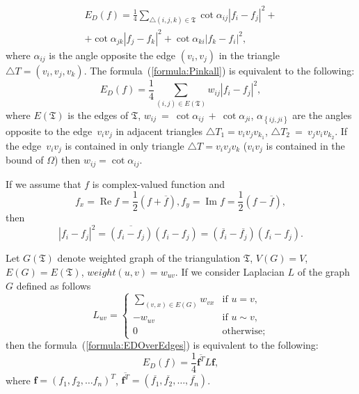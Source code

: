 \documentclass{article}
\newcommand{\conjugate}{\overline}
\newcommand{\re}{\operatorname{Re}}
\newcommand{\im}{\operatorname{Im}}
\begin{document}
\begin{multline}
\label{formula:Pinkall}
  E_D(f) = \frac{1}{4} \sum_{\triangle (i, j, k) \in \mathfrak{T}} \cot{\alpha_{ij}}|f_i - f_j|^2 + \\
  + \cot{\alpha_{jk}}|f_j - f_k|^2 + \cot{\alpha_{ki}}|f_k - f_i|^2,
\end{multline}
where $\alpha_{ij}$ is the angle opposite the edge $(v_i, v_j)$ in the triangle $\triangle T = (v_i, v_j, v_k)$. The formula~(\ref{formula:Pinkall}) is equivalent to the following:
\begin{equation}
\label{formula:EDOverEdges}
  E_D(f) = \frac{1}{4} \sum_{\left( i, j \right) \in E\left(\mathfrak{T}\right)}{w_{ij} |f_i - f_j|^2}, 
\end{equation}
where $E(\mathfrak{T})$ is the edges of $\mathfrak{T}$, $w_{ij}~=~\cot\alpha_{ij}~+~\cot\alpha_{ji}$, $\alpha_{\left\{{ij, ji}\right\}}$ are the angles opposite 
to the edge~$v_i v_j$ in adjacent triangles $\triangle T_1=v_i v_j v_{k_1}$, $\triangle T_2~=~v_j v_i v_{k_2}$. If the edge~$v_i v_j$ is contained in only triangle $\triangle T=v_i v_j v_k$ 
($v_i v_j$ is contained in the bound of $\Omega$) then $w_{ij} = \cot \alpha_{ij}$.

If we assume that $f$ is complex-valued function and 
$$f_x=\re{f}=\frac{1}{2}\left(f + \conjugate{f}\right), f_y=\im{f}=\frac{1}{2}\left(f - \conjugate{f}\right),$$ 
then $$|f_i - f_j|^2 = \conjugate{(f_i - f_j)}(f_i - f_j) = (\conjugate{f_i} - \conjugate{f_j})(f_i - f_j).$$ 

Let $G(\mathfrak{T})$ denote weighted graph of the triangulation $\mathfrak{T}$, $V(G) = V$, $E(G) = E(\mathfrak{T})$, $weight(u, v) = w_{uv}$. 
If we consider Laplacian $L$ of the graph $G$ defined as follows 
$$ L_{uv} = \begin{cases}
  \sum_{(v, x) \in E(G)}{w_{vx}}&\text{if $u = v,$} \\
  -w_{uv}&\text{if $u \sim v,$} \\
  0 &\text{otherwise;}
\end{cases}
$$ then the formula~(\ref{formula:EDOverEdges}) is equivalent to the following:
\begin{equation}
  \label{formula:EDOverLaplacian}
  E_D(f) = \frac{1}{4} \conjugate{\mathbf{f}^T} L \mathbf{f},
\end{equation}
where $\mathbf{f} = (f_1, f_2, \dots f_n)^T$, $\conjugate{\mathbf{f}^T} = (\conjugate{f_1}, \conjugate{f_2}, \dots, \conjugate{f_n})$.
\end{document}
